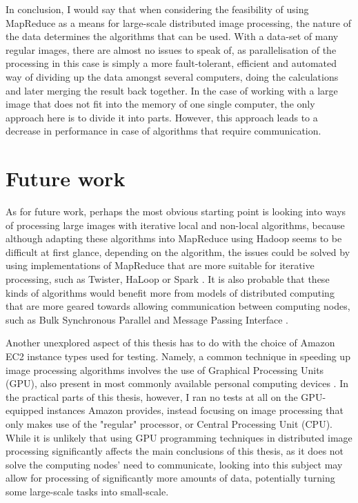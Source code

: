 \documentclass [12pt,a4paper]{report}
\begin{document}
In conclusion, I would say that when considering the feasibility of using MapReduce as a means for large-scale distributed image processing, the nature of the data determines the algorithms that can be used. With a data-set of many regular images, there are almost no issues to speak of, as parallelisation of the processing in this case is simply a more fault-tolerant, efficient and automated way of dividing up the data amongst several computers, doing the calculations and later merging the result back together. In the case of working with a large image that does not fit into the memory of one single computer, the only approach here is to divide it into parts. However, this approach leads to a decrease in performance in case of algorithms that require communication.

\chapter{Future work}

As for future work, perhaps the most obvious starting point is looking into ways of processing large images with iterative local and non-local algorithms, because although adapting these algorithms into MapReduce using Hadoop seems to be difficult at first glance, depending on the algorithm, the issues could be solved by using implementations of MapReduce that are more suitable for iterative processing, such as Twister, HaLoop or Spark \cite{ekanayake2010twister,bu2010haloop,zaharia2010spark}. It is also probable that these kinds of algorithms would benefit more from models of distributed computing that are more geared towards allowing communication between computing nodes, such as Bulk Synchronous Parallel and Message Passing Interface \cite{valiant1990bridging,gropp1999using}.

Another unexplored aspect of this thesis has to do with the choice of Amazon EC2 instance types used for testing. Namely, a common technique in speeding up image processing algorithms involves the use of Graphical Processing Units (GPU), also present in most commonly available personal computing devices \cite{pharr2005gpu}. In the practical parts of this thesis, however, I ran no tests at all on the GPU-equipped instances Amazon provides, instead focusing on image processing that only makes use of the "regular" processor, or Central Processing Unit (CPU). While it is unlikely that using GPU programming techniques in distributed image processing significantly affects the main conclusions of this thesis, as it does not solve the computing nodes' need to communicate, looking into this subject may allow for processing of significantly more amounts of data, potentially turning some large-scale tasks into small-scale.
\end{document}
